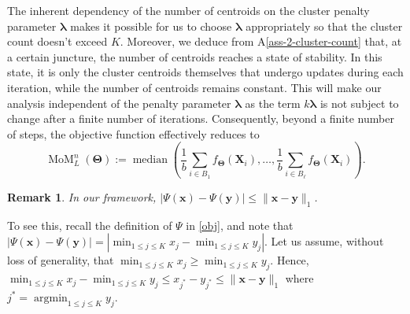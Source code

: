 \documentclass{article}
\newcommand{\bTheta}{\boldsymbol{\Theta}}
\newtheorem{lemma}{Lemma}[section]
\newtheorem{remark}{\textbf{Remark}}
\begin{document}
The inherent dependency of the number of centroids on the cluster penalty parameter $\bm{\lambda}$ makes it possible for us to choose $\bm{\lambda}$ appropriately so that the cluster count doesn't exceed $K$. Moreover, we deduce from A\ref{ass-2-cluster-count} that, at a certain juncture, the number of centroids reaches a state of stability. In this state, it is only the cluster centroids themselves that undergo updates during each iteration, while the number of centroids remains constant. This will make our analysis independent of the penalty parameter $\bm{\lambda}$ as the term $k\bm{\lambda}$ is not subject to change after a finite number of iterations. Consequently, beyond a finite number of steps, the objective function effectively reduces to 
\begin{equation}\label{DP-MoM-obj}
    \operatorname{MoM}_L^n(\bTheta) := \operatorname{median} \left(\frac{1}{b}\sum_{i\in B_{1}}f_{\bm{\Theta}}(\bm{X}_i), \ldots, \frac{1}{b}\sum_{i\in B_{\ell}}f_{\bm{\Theta}}(\bm{X}_i)\right).
\end{equation} 

\begin{remark}
    In our framework, $\displaystyle |\Psi(\bm{x})-\Psi(\bm{y})|\le \|\bm{x}-\bm{y}\|_1$.
\end{remark}

To see this, recall the definition of $\Psi$ in \eqref{obj}, and note that $|\Psi(\bm{x})-\Psi(\bm{y})|=|\min_{1\le j\le K}x_j-\min_{1\le j\le K}y_j|$. Let us assume, without loss of generality, that $\min_{1\le j\le K}x_j\ge \min_{1\le j\le K}y_j$. Hence, $\min_{1\le j\le K}x_j-\min_{1\le j\le K}y_j\le x_{j^*}-y_{j^*}\le \|\bm{x}-\bm{y}\|_1$ where $j^* = \operatorname{argmin}_{1\le j\le K}y_j$.



\end{document}
